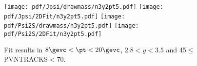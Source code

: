\begin{figure}[H]
\begin{center}
\texttt{[image: pdf/Jpsi/drawmass/n3y2pt5.pdf]}
\texttt{[image: pdf/Jpsi/2DFit/n3y2pt5.pdf]}
\vspace*{-0.5cm}
\texttt{[image: pdf/Psi2S/drawmass/n3y2pt5.pdf]}
\texttt{[image: pdf/Psi2S/2DFit/n3y2pt5.pdf]}
\vspace*{-0.5cm}
\end{center}
\caption{Fit results in $8\gevc<\pt<20\gevc$, $2.8<y<3.5$ and 45$\leq$PVNTRACKS$<$70.}
\label{Fitn3y2pt5}
\end{figure}
